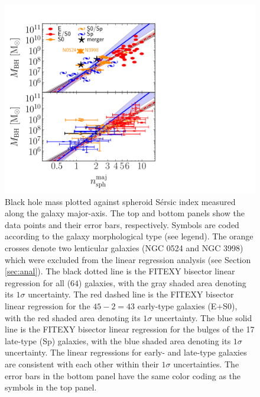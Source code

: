 \documentclass[preprint2]{emulateapj}
\begin{document}
\begin{figure}[h]
\begin{center}
\includegraphics[width=\columnwidth, trim = 20 0 220 0]{mbh_vs_n_maj.pdf}
\caption{Black hole mass plotted against spheroid S\'ersic index measured along the galaxy major-axis. 
The top and bottom panels show the data points and their error bars, respectively.  
Symbols are coded according to the galaxy morphological type (see legend). 
The orange crosses denote two lenticular galaxies (NGC 0524 and NGC 3998) which were excluded from the linear regression analysis 
(see Section \ref{sec:anal}). 
The black dotted line is the FITEXY bisector linear regression for all ($64$) galaxies, 
with the gray shaded area denoting its $1\sigma$ uncertainty. 
The red dashed line is the FITEXY bisector linear regression for the $45-2=43$  early-type galaxies (E+S0), 
with the red shaded area denoting its $1\sigma$ uncertainty. 
The blue solid line is the FITEXY bisector linear regression for the bulges of the 17 late-type (Sp) galaxies, 
with the blue shaded area denoting its $1\sigma$ uncertainty. 
The linear regressions for early- and late-type galaxies are consistent with each other within their $1\sigma$ uncertainties.  
The error bars in the bottom panel have the same color coding as the symbols in the top panel. 
}
\label{fig:mbhn}
\end{center}
\end{figure}
\end{document}
